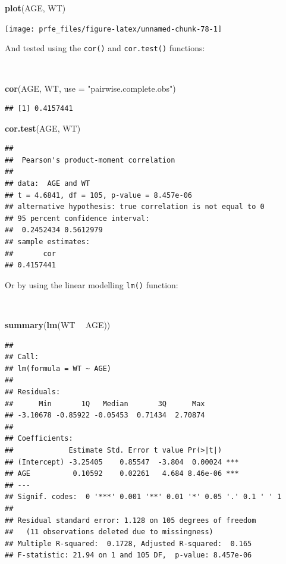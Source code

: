 \documentclass[12pt,a4paper]{book}
\newenvironment{Shaded}{\begin{snugshade}}{\end{snugshade}}
\newcommand{\KeywordTok}[1]{\textcolor[rgb]{0.13,0.29,0.53}{\textbf{#1}}}
\newcommand{\DataTypeTok}[1]{\textcolor[rgb]{0.13,0.29,0.53}{#1}}
\newcommand{\StringTok}[1]{\textcolor[rgb]{0.31,0.60,0.02}{#1}}
\newcommand{\OperatorTok}[1]{\textcolor[rgb]{0.81,0.36,0.00}{\textbf{#1}}}
\newcommand{\NormalTok}[1]{#1}
\theoremstyle{definition}
\theoremstyle{definition}
\theoremstyle{definition}
\theoremstyle{remark}
\begin{document}
\begin{Shaded}
\begin{Highlighting}[]
\KeywordTok{plot}\NormalTok{(AGE, WT)}
\end{Highlighting}
\end{Shaded}

\begin{center}\texttt{[image: prfe\_files/figure-latex/unnamed-chunk-78-1]} \end{center}

\newpage

And tested using the \texttt{cor()} and \texttt{cor.test()} functions:

~

\begin{Shaded}
\begin{Highlighting}[]
\KeywordTok{cor}\NormalTok{(AGE, WT, }\DataTypeTok{use =} \StringTok{"pairwise.complete.obs"}\NormalTok{)}
\end{Highlighting}
\end{Shaded}

\begin{verbatim}
## [1] 0.4157441
\end{verbatim}

\begin{Shaded}
\begin{Highlighting}[]
\KeywordTok{cor.test}\NormalTok{(AGE, WT)}
\end{Highlighting}
\end{Shaded}

\begin{verbatim}
## 
##  Pearson's product-moment correlation
## 
## data:  AGE and WT
## t = 4.6841, df = 105, p-value = 8.457e-06
## alternative hypothesis: true correlation is not equal to 0
## 95 percent confidence interval:
##  0.2452434 0.5612979
## sample estimates:
##       cor 
## 0.4157441
\end{verbatim}

\newpage

Or by using the linear modelling \texttt{lm()} function:

~

\begin{Shaded}
\begin{Highlighting}[]
\KeywordTok{summary}\NormalTok{(}\KeywordTok{lm}\NormalTok{(WT }\OperatorTok{~}\StringTok{ }\NormalTok{AGE))}
\end{Highlighting}
\end{Shaded}

\begin{verbatim}
## 
## Call:
## lm(formula = WT ~ AGE)
## 
## Residuals:
##      Min       1Q   Median       3Q      Max 
## -3.10678 -0.85922 -0.05453  0.71434  2.70874 
## 
## Coefficients:
##             Estimate Std. Error t value Pr(>|t|)    
## (Intercept) -3.25405    0.85547  -3.804  0.00024 ***
## AGE          0.10592    0.02261   4.684 8.46e-06 ***
## ---
## Signif. codes:  0 '***' 0.001 '**' 0.01 '*' 0.05 '.' 0.1 ' ' 1
## 
## Residual standard error: 1.128 on 105 degrees of freedom
##   (11 observations deleted due to missingness)
## Multiple R-squared:  0.1728, Adjusted R-squared:  0.165 
## F-statistic: 21.94 on 1 and 105 DF,  p-value: 8.457e-06
\end{verbatim}
\end{document}
